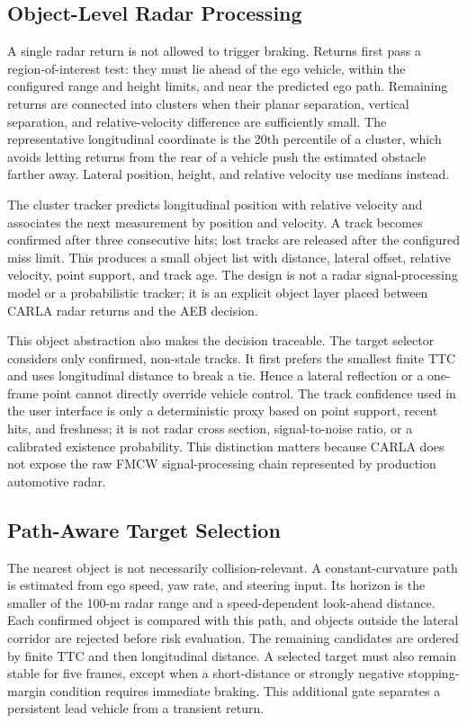 \documentclass[conference]{IEEEtran}
\begin{document}
\subsection{Object-Level Radar Processing}
A single radar return is not allowed to trigger braking. Returns first pass a
region-of-interest test: they must lie ahead of the ego vehicle, within the
configured range and height limits, and near the predicted ego path. Remaining
returns are connected into clusters when their planar separation, vertical
separation, and relative-velocity difference are sufficiently small. The
representative longitudinal coordinate is the 20th percentile of a cluster,
which avoids letting returns from the rear of a vehicle push the estimated
obstacle farther away. Lateral position, height, and relative velocity use
medians instead.

The cluster tracker predicts longitudinal position with relative velocity and
associates the next measurement by position and velocity. A track becomes
confirmed after three consecutive hits; lost tracks are released after the
configured miss limit. This produces a small object list with distance, lateral
offset, relative velocity, point support, and track age. The design is not a
radar signal-processing model or a probabilistic tracker; it is an explicit
object layer placed between CARLA radar returns and the AEB decision.

This object abstraction also makes the decision traceable. The target selector
considers only confirmed, non-stale tracks. It first prefers the smallest finite
TTC and uses longitudinal distance to break a tie. Hence a lateral reflection or
a one-frame point cannot directly override vehicle control. The track confidence
used in the user interface is only a deterministic proxy based on point support,
recent hits, and freshness; it is not radar cross section, signal-to-noise ratio,
or a calibrated existence probability. This distinction matters because CARLA
does not expose the raw FMCW signal-processing chain represented by production
automotive radar.

\subsection{Path-Aware Target Selection}
The nearest object is not necessarily collision-relevant. A constant-curvature
path is estimated from ego speed, yaw rate, and steering input. Its horizon is
the smaller of the 100-m radar range and a speed-dependent look-ahead distance.
Each confirmed object is compared with this path, and objects outside the
lateral corridor are rejected before risk evaluation. The remaining candidates
are ordered by finite TTC and then longitudinal distance. A selected target must
also remain stable for five frames, except when a short-distance or strongly
negative stopping-margin condition requires immediate braking. This additional
gate separates a persistent lead vehicle from a transient return.
\end{document}
